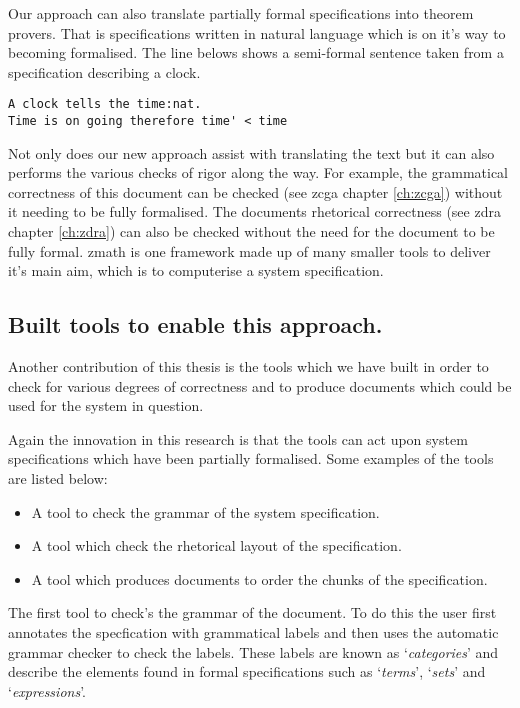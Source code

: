 Our approach can also translate partially formal specifications into theorem provers. That is specifications written in natural language which is on it's way to becoming formalised. The line belows shows a semi-formal sentence taken from a specification describing a clock.

\begin{verbatim}
A clock tells the time:nat.
Time is on going therefore time' < time
\end{verbatim}

Not only does our new approach assist with translating the text but it can also performs the various checks of rigor along the way. For example, the grammatical correctness of this document can be checked (see \gls{zcga} chapter \ref{ch:zcga}) without it needing to be fully formalised. The documents rhetorical correctness (see \gls{zdra} chapter \ref{ch:zdra}) can also be checked without the need for the document to be fully formal. \Gls{zmath} is one framework made up of many smaller tools to deliver it's main aim, which is to computerise a system specification.

\subsection{Built tools to enable this approach.}

Another contribution of this thesis is the tools which we have built in order to check for various degrees of correctness and to produce documents which could be used for the system in question.

Again the innovation in this research is that the tools can act upon system specifications which have been partially formalised. Some examples of the tools are listed below:

\begin{itemize}
\item A tool to check the grammar of the system specification.

\item A tool which check the rhetorical layout of the specification.

\item A tool which produces documents to order the chunks of the specification.
\end{itemize}

The first tool to check's the grammar of the document. To do this the user first annotates the specfication with grammatical labels and then uses the automatic grammar checker to check the labels. These labels are known as `\emph{categories}' and describe the elements found in formal specifications such as `\emph{terms}', `\emph{sets}' and `\emph{expressions}'. 

